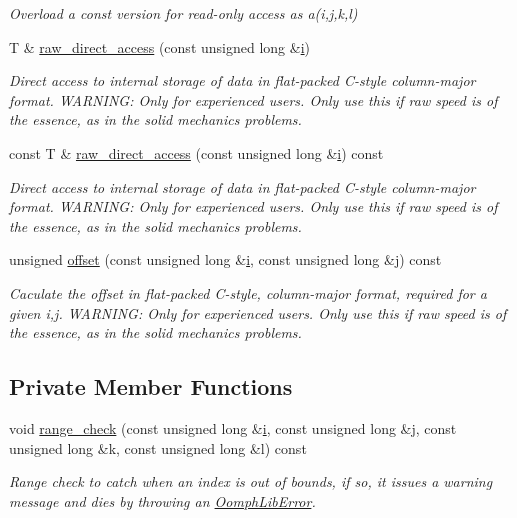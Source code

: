 \begin{DoxyCompactItemize}
\begin{DoxyCompactList}\small\item\em Overload a const version for read-\/only access as a(i,j,k,l) \end{DoxyCompactList}\item 
T \& \hyperlink{classoomph_1_1RankFourTensor_a07c6ce750dba7430ef8215bbd1f6a307}{raw\+\_\+direct\+\_\+access} (const unsigned long \&\hyperlink{cfortran_8h_adb50e893b86b3e55e751a42eab3cba82}{i})
\begin{DoxyCompactList}\small\item\em Direct access to internal storage of data in flat-\/packed C-\/style column-\/major format. W\+A\+R\+N\+I\+NG\+: Only for experienced users. Only use this if raw speed is of the essence, as in the solid mechanics problems. \end{DoxyCompactList}\item 
const T \& \hyperlink{classoomph_1_1RankFourTensor_a92c57d9b49eff2f3bd6759ead3a98414}{raw\+\_\+direct\+\_\+access} (const unsigned long \&\hyperlink{cfortran_8h_adb50e893b86b3e55e751a42eab3cba82}{i}) const
\begin{DoxyCompactList}\small\item\em Direct access to internal storage of data in flat-\/packed C-\/style column-\/major format. W\+A\+R\+N\+I\+NG\+: Only for experienced users. Only use this if raw speed is of the essence, as in the solid mechanics problems. \end{DoxyCompactList}\item 
unsigned \hyperlink{classoomph_1_1RankFourTensor_a4218f2bff16fe393ed704207e39c9b55}{offset} (const unsigned long \&\hyperlink{cfortran_8h_adb50e893b86b3e55e751a42eab3cba82}{i}, const unsigned long \&j) const
\begin{DoxyCompactList}\small\item\em Caculate the offset in flat-\/packed C-\/style, column-\/major format, required for a given i,j. W\+A\+R\+N\+I\+NG\+: Only for experienced users. Only use this if raw speed is of the essence, as in the solid mechanics problems. \end{DoxyCompactList}\end{DoxyCompactItemize}
\subsection*{Private Member Functions}
\begin{DoxyCompactItemize}
\item 
void \hyperlink{classoomph_1_1RankFourTensor_ad9e629184b51ee7cb8074ce6d3641f36}{range\+\_\+check} (const unsigned long \&\hyperlink{cfortran_8h_adb50e893b86b3e55e751a42eab3cba82}{i}, const unsigned long \&j, const unsigned long \&k, const unsigned long \&l) const
\begin{DoxyCompactList}\small\item\em Range check to catch when an index is out of bounds, if so, it issues a warning message and dies by throwing an {\ttfamily \hyperlink{classoomph_1_1OomphLibError}{Oomph\+Lib\+Error}}. \end{DoxyCompactList}\end{DoxyCompactItemize}
